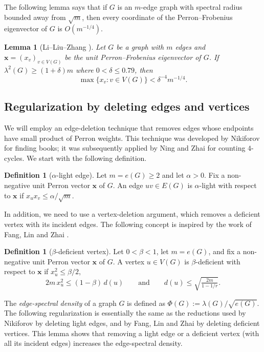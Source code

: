 \documentclass[11pt,a4paper]{article}
\newtheorem{lemma}[theorem]{Lemma}
\theoremstyle{definition}
\newtheorem{definition}[theorem]{Definition}
\theoremstyle{plain}
\renewcommand{\le}{\leqslant}
\renewcommand{\ge}{\geqslant}
\begin{document}
The following lemma says that if  $G$ is an $m$-edge graph with spectral radius bounded away from $\sqrt{m}$, then every coordinate of the Perron--Frobenius eigenvector of $G$ is $O(m^{-1/4})$. 

\begin{lemma}[Li--Liu--Zhang \cite{LLZ-edge-spectral}] \label{lem:LLZ} 
Let $G$ be a graph with $m$ edges and $\bm{x}=(x_v)_{v\in V(G)}$ be the unit Perron--Frobenius eigenvector of $G$.  
 If $\lambda^2 (G) \ge (1+\delta)m$ where $0<\delta \le 0.79$, then 
\[ \max\{x_v : v\in V(G)\} < {\delta^{-4}m^{-1/4} }. \] 
\end{lemma} 



\subsection{Regularization by deleting edges and vertices}

We will employ an edge-deletion technique that removes edges whose endpoints have small product of Perron weights. 
This technique was developed by Nikiforov \cite{Niki2021} for finding books; it was subsequently applied by Ning and Zhai \cite{NZ2021b} for counting $4$-cycles.  
We start with the following definition. 

\begin{definition}[$\alpha$-light edge]
\label{def:alpha-light}
Let $m=e(G)\ge2$ and let $\alpha>0$. Fix a
non-negative unit Perron vector $\bm{x}$ of $G$. 
An edge
$uv\in E(G)$ is $\alpha$-light with respect to $\bm{x}$ 
if $  x_ux_v\le {\alpha}/{\sqrt m}$. 
\end{definition}


In addition, we need to use a vertex-deletion argument, which removes a deficient vertex with its incident edges. 
The following concept is inspired by the work of Fang, Lin and Zhai \cite{FLZ}.


\begin{definition}[$\beta$-deficient vertex]
\label{def:beta-deficient}
Let $0<\beta<1$, let $m=e(G)$, and fix a
non-negative unit Perron vector $\bm{x}$ of $G$. 
A vertex $u\in V(G)$ is $\beta$-deficient with
respect to $\bm{x}$ if $x_{u}^2\le\beta/2$, 
\[
  2m\,x_{u}^2\le(1-\beta)\,d(u)
  \qquad\text{and}\qquad
  d(u)\le\sqrt{\tfrac{2m}{1-1/r}}.
\]
\end{definition} 



The {\it edge-spectral density} of a graph $G$ is defined as 
 $ \Phi(G) := {\lambda(G)}/ {\sqrt{e(G)}}. $  
The following regularization is essentially the same as the reductions used by Nikiforov \cite{Niki2021} by deleting light edges, and by Fang, Lin and Zhai \cite{FLZ} by deleting deficient vertices. This lemma shows that removing a light edge or a deficient vertex (with all its incident edges) increases the edge-spectral density. 
\end{document}
